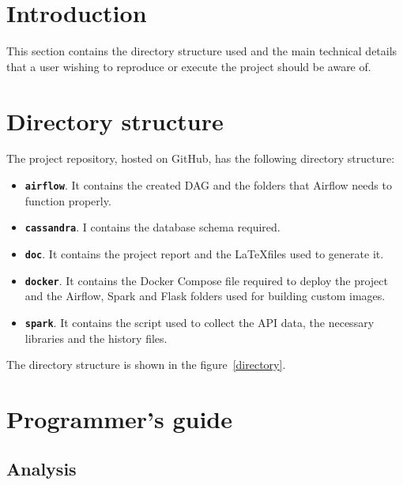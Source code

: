 
\section{Introduction}

\nonzeroparskip This section contains the directory structure used and the main technical details that a user wishing to reproduce or execute the project should be aware of.

\section{Directory structure}
\nonzeroparskip The project repository, hosted on GitHub, has the following directory structure:
\begin{itemize}
	\item \textbf{\texttt{airflow}}. It contains the created DAG and the folders that Airflow needs to function properly.
	\item \textbf{\texttt{cassandra}}. I contains the database schema required.
	\item \textbf{\texttt{doc}}. It contains the project report and the \LaTeX files used to generate it.
	\item \textbf{\texttt{docker}}. It contains the Docker Compose file required to deploy the project and the Airflow, Spark and Flask folders used for building custom images.
	\item \textbf{\texttt{spark}}. It contains the script used to collect the API data, the necessary libraries and the history files.
\end{itemize}

\nonzeroparskip The directory structure is shown in the figure~\ref{directory}. 

\section{Programmer's guide}

\subsection{Analysis}


